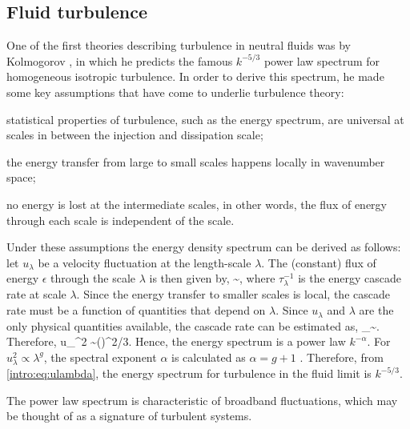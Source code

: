     \subsection{Fluid turbulence}
    \label{intro:sec:turb:fluid}
    One of the
    first theories describing turbulence in neutral fluids was by Kolmogorov \cite{kolmogorov41},
    in which he predicts the famous $k^{-5/3}$ power law spectrum for homogeneous
    isotropic turbulence. In order to derive this spectrum, he
    made some key assumptions that have come to underlie turbulence theory: 
    \begin{inparaenum}[(i)]
        \item  statistical properties of turbulence, such as the energy spectrum, are universal at scales in between the injection and dissipation scale;
        \item the energy transfer from large to small scales happens locally in wavenumber
        space;
        \item no energy is lost at the intermediate scales, in other words, the flux of
        energy through each scale is independent of the scale.
    \end{inparaenum}

    Under these assumptions the energy density spectrum can be derived as follows: let
    $u_\lambda$ be a velocity fluctuation at the length-scale $\lambda$. The (constant) flux of energy
    $\epsilon$ through the scale $\lambda$ is then given by,
    \beq
        \sim \epsilon,
    \eeq
    where $\tau_\lambda^{-1}$ is the energy cascade rate at scale $\lambda$. Since
    the energy transfer to smaller scales is local, the cascade rate must be a function
    of quantities that depend on $\lambda$. Since $u_\lambda$ and $\lambda$ are the only
    physical quantities available, the cascade rate can be estimated as,
    \beq
        \tau_\lambda \sim {}.
    \eeq
    Therefore, 
    \beq
        u_\lambda^2 \sim (\epsilon \lambda)^{2/3}. \label{intro:eq:ulambda}
    \eeq
    Hence, the energy spectrum is a power law $k^{-\alpha}$. For $u_\lambda^2 \propto
    \lambda^g$, the spectral exponent $\alpha$ is calculated as $\alpha = g + 1$
    \cite{monin75}. Therefore, from \eqref{intro:eq:ulambda}, the energy spectrum for 
    turbulence in the fluid limit is $k^{-5/3}$. 
    
	The power law spectrum is characteristic of broadband fluctuations, which may
	be thought of as a signature of turbulent systems.

